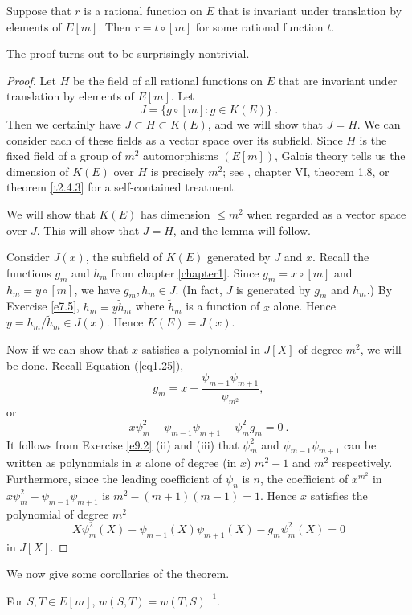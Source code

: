 \begin{lem}
\label{l13.7}
Suppose that $r$ is a rational function on $E$ that is invariant under translation by elements of $E[m]$. Then $r=t\circ[m]$ for some rational function $t$.
\end{lem}

The proof turns out to be surprisingly nontrivial.

\begin{proof}
Let $H$ be the field of all rational functions on $E$ that are invariant under translation by elements of $E[m]$. Let
$$
J=\{g\circ[m]:g\in K(E)\}\ .
$$
Then we certainly have $J\subset H\subset K(E)$, and we will show that $J=H$. We can consider each of these fields as a vector space over its subfield. Since $H$ is the fixed field of a group of $m^{2}$ automorphisms $(E[m])$, Galois theory tells us the dimension of $K(E)$ over $H$ is precisely $m^{2}$; see \cite{r1.2}, chapter VI, theorem 1.8, or theorem \ref{t2.4.3} for a self-contained treatment. 

We will show that $K(E)$ has dimension $\leq m^{2}$ when regarded as a vector space over $J$. This will show that $J=H$, and the lemma will follow.

Consider $J(x)$, the subfield of $K(E)$ generated by $J$ and $x$. Recall the functions $g_{m}$ and $h_{m}$ from chapter \ref{chapter1}. Since $g_{m}=x\circ[m]$ and $h_{m}=y\circ[m]$, we have $g_{m}, h_{m} \in J$. (In fact, $J$ is generated by $g_{m}$ and $h_{m}.$) By Exercise \ref{e7.5}, $h_{m}=y\tilde{h}_{m}$ where $\tilde{h}_{m}$ is a function of $x$ alone. Hence $y=h_{m}/\tilde{h}_{m}\in J(x)$. Hence $K(E)=J(x)$.

Now if we can show that $x$ satisfies a polynomial in $J[X]$ of degree $m^{2}$, we will be done. Recall Equation (\ref{eq1.25}),
$$
g_{m}=x-\frac{\psi_{m-1}\psi_{m+1}}{\psi_{m^{2}}},
$$
or
$$
x\psi_{m}^{2}-\psi_{m-1}\psi_{m+1}-\psi_{m}^{2}g_{m}=0\ .
$$
It follows from Exercise \ref{e9.2} (ii) and (iii) that $\psi_{m}^{2}$ and $\psi_{m-1}\psi_{m+1}$ can be written as polynomials in $x$ alone of degree (in $x$) $m^{2}-1$ and $m^{2}$ respectively. Furthermore, since the leading coefficient of $\psi_{n}$ is $n$, the coefficient of $x^{m^{2}}$ in $x\psi_{m}^{2}-\psi_{m-1}\psi_{m+1}$ is $m^{2}-(m+1)(m-1)=1$. Hence $x$ satisfies the polynomial of degree $m^{2}$
$$
X\psi_{m}^{2}(X)-\psi_{m-1}(X)\psi_{m+1}(X)-g_{m}\psi_{m}^{2}(X)=0
$$
in $J[X]$.
\end{proof}
We now give some corollaries of the theorem.

\begin{coro}
\label{c13.8}
For $S,T\in E[m]$, $w(S,T)=w(T,S)^{-1}$.
\end{coro}

